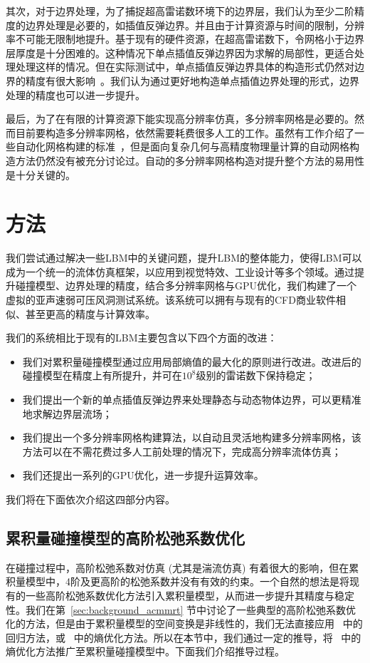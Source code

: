 其次，对于边界处理，为了捕捉超高雷诺数环境下的边界层，我们认为至少二阶精度的边界处理是必要的，如插值反弹边界。并且由于计算资源与时间的限制，分辨率不可能无限制地提升。基于现有的硬件资源，在超高雷诺数下，令网格小于边界层厚度是十分困难的。这种情况下单点插值反弹边界因为求解的局部性，更适合处理处理这样的情况。但在实际测试中，单点插值反弹边界具体的构造形式仍然对边界的精度有很大影响~\citep{Chen-2021-b}。我们认为通过更好地构造单点插值边界处理的形式，边界处理的精度也可以进一步提升。

最后，为了在有限的计算资源下能实现高分辨率仿真，多分辨率网格是必要的。然而目前要构造多分辨率网格，依然需要耗费很多人工的工作。虽然有工作介绍了一些自动化网格构建的标准~\citep{THORIMBERT2022101864}，但是面向复杂几何与高精度物理量计算的自动网格构造方法仍然没有被充分讨论过。自动的多分辨率网格构造对提升整个方法的易用性是十分关键的。

\section{方法}
我们尝试通过解决一些LBM中的关键问题，提升LBM的整体能力，使得LBM可以成为一个统一的流体仿真框架，以应用到视觉特效、工业设计等多个领域。通过提升碰撞模型、边界处理的精度，结合多分辨率网格与GPU优化，我们构建了一个虚拟的亚声速弱可压风洞测试系统。该系统可以拥有与现有的CFD商业软件相似、甚至更高的精度与计算效率。

我们的系统相比于现有的LBM主要包含以下四个方面的改进：
\begin{itemize}
	\item 我们对累积量碰撞模型通过应用局部熵值的最大化的原则进行改进。改进后的碰撞模型在精度上有所提升，并可在$10^8$级别的雷诺数下保持稳定； 
	\item 我们提出一个新的单点插值反弹边界来处理静态与动态物体边界，可以更精准地求解边界层流场；
	\item 我们提出一个多分辨率网格构建算法，以自动且灵活地构建多分辨率网格，该方法可以在不需花费过多人工前处理的情况下，完成高分辨率流体仿真；
	\item 我们还提出一系列的GPU优化，进一步提升运算效率。
\end{itemize}

我们将在下面依次介绍这四部分内容。

\subsection{累积量碰撞模型的高阶松弛系数优化}
在碰撞过程中，高阶松弛系数对仿真 (尤其是湍流仿真) 有着很大的影响，但在累积量模型中，4阶及更高阶的松弛系数并没有有效的约束。一个自然的想法是将现有的一些高阶松弛系数优化方法引入累积量模型，从而进一步提升其精度与稳定性。我们在第~\ref{sec:background_acmmrt} 节中讨论了一些典型的高阶松弛系数优化的方法，但是由于累积量模型的空间变换是非线性的，我们无法直接应用~\citep{Li-2020} 中的回归方法，或~\citep{Kramer-2019} 中的熵优化方法。所以在本节中，我们通过一定的推导，将~\citep{Kramer-2019} 中的熵优化方法推广至累积量碰撞模型中。下面我们介绍推导过程。

